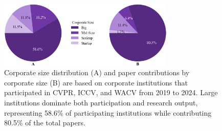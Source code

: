 \documentclass{article}
\begin{document}
\begin{figure}[ht]
  \centering
  \includegraphics[width=0.75\textwidth]{report/images/pie_charts.png}  
  \caption{Corporate size distribution (A) and paper contributions by corporate size (B) are based on corporate institutions that participated in CVPR, ICCV, and WACV from 2019 to 2024. Large institutions dominate both participation and research output, representing 58.6\% of participating institutions while contributing 80.5\% of the total papers.}
  \vspace{-10pt}
  \label{fig:corporate_size_graph}
\end{figure}

\vspace{-10pt}
\end{document}
